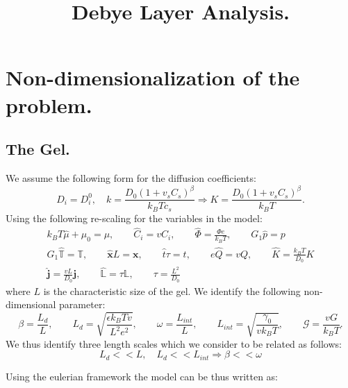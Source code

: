 \documentclass[12pt]{extarticle}
\title{Debye Layer Analysis.}
\author{}
\newcommand{\LL}{\ensuremath{\mathbb{L}}}
\begin{document}
\section{Non-dimensionalization of the problem.}
\subsection{The Gel.}
We assume the following form for the diffusion coefficients:
\begin{equation}
D_i=D_i^0,\quad k = \frac{D_0(1+v_sC_s)^\beta}{k_B T c_s} \Rightarrow K= \frac{D_0(1+v_sC_s)^\beta}{k_B T}.
\end{equation}
Using the following re-scaling for the variables in the model:
\begin{equation*}
\begin{aligned}
k_BT\hat{\mu} + \mu_0= \mu, \qquad \hat{C}_i = vC_i, \qquad \hat{\Phi} = \frac{\Phi e}{k_B T}, \qquad  G_1\hat{p}= p\\
G_1\hat{\mathbb{T}}=\mathbb{T}, \qquad\hat{\mathbf{x}} L =\mathbf{x}, \qquad \hat{t}\tau=t, \qquad e\hat{Q} =v Q, \qquad \hat{K} = \frac{k_BT}{D_0}K\\
\hat{\mathbf{j}}=\frac{vL}{D_0}\mathbf{j}, \qquad \hat{\LL}= \tau \LL, \qquad \tau=\frac{L^2}{D_0}
\end{aligned}
\end{equation*}
where $L$ is the characteristic size of the gel. We identify the following non-dimensional parameter:
\begin{equation*}
\beta=\frac{L_d}{L}, \qquad L_d= \sqrt{\frac{\epsilon k_B Tv}{L^2e^2}}, \qquad \omega= \frac{L_{int}}{L}, \qquad L_{int}=\sqrt{\frac{\gamma_0}{vk_BT}}, \qquad \mathcal{G}=\frac{vG}{k_BT}.
\end{equation*}
We thus identify three length scales which we consider to be related as follows:
\begin{equation}
L_d<<L, \quad L_d<<L_{int} \Rightarrow \beta<<\omega
\end{equation}

Using the eulerian framework the model can be thus written as:
\end{document}
